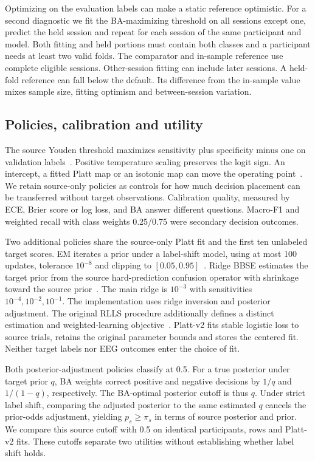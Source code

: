 Optimizing on the evaluation labels can make a static reference optimistic. For a second diagnostic we fit the BA-maximizing threshold on all sessions except one, predict the held session and repeat for each session of the same participant and model. Both fitting and held portions must contain both classes and a participant needs at least two valid folds. The comparator and in-sample reference use complete eligible sessions. Other-session fitting can include later sessions. A held-fold reference can fall below the default. Its difference from the in-sample value mixes sample size, fitting optimism and between-session variation.

\subsection{Policies, calibration and utility}
The source Youden threshold maximizes sensitivity plus specificity minus one on validation labels~\cite{youden1950}. Positive temperature scaling preserves the logit sign. An intercept, a fitted Platt map or an isotonic map can move the operating point~\cite{platt1999,guo2017}. We retain source-only policies as controls for how much decision placement can be transferred without target observations. Calibration quality, measured by ECE, Brier score or log loss, and BA answer different questions. Macro-F1 and weighted recall with class weights 0.25/0.75 were secondary decision outcomes.

Two additional policies share the source-only Platt fit and the first ten unlabeled target scores. EM iterates a prior under a label-shift model, using at most 100 updates, tolerance $10^{-8}$ and clipping to $[0.05,0.95]$~\cite{saerens2002,alexandari2020}. Ridge BBSE estimates the target prior from the source hard-prediction confusion operator with shrinkage toward the source prior~\cite{lipton2018}. The main ridge is $10^{-3}$ with sensitivities $10^{-4},10^{-2},10^{-1}$. The implementation uses ridge inversion and posterior adjustment. The original RLLS procedure additionally defines a distinct estimation and weighted-learning objective~\cite{azizzadenesheli2019}. Platt-v2 fits stable logistic loss to source trials, retains the original parameter bounds and stores the centered fit. Neither target labels nor EEG outcomes enter the choice of fit.

Both posterior-adjustment policies classify at 0.5. For a true posterior under target prior $q$, BA weights correct positive and negative decisions by $1/q$ and $1/(1-q)$, respectively. The BA-optimal posterior cutoff is thus $q$. Under strict label shift, comparing the adjusted posterior to the same estimated $q$ cancels the prior-odds adjustment, yielding $p_s\geq\pi_s$ in terms of source posterior and prior. We compare this source cutoff with 0.5 on identical participants, rows and Platt-v2 fits. These cutoffs separate two utilities without establishing whether label shift holds.

